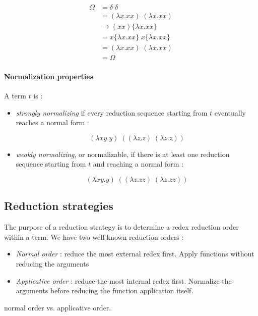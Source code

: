   \begin{align*}
    \Omega &= \delta\;\delta \\
          &= (\lambda x.xx)\; (\lambda x.xx) \\
          &\to (xx)\{\lambda x.xx\} \\
          &= x\{\lambda x.xx\}\;x\{\lambda x.xx\} \\
          &= (\lambda x.xx)\; (\lambda x.xx) \\
          &= \Omega
  \end{align*}

  \paragraph{Normalization properties} A term $t$ is :

  \begin{itemize}
    \item \textit{strongly normalizing} if every reduction sequence starting
      from $t$ eventually reaches a normal form :

      \[(\lambda xy.y)\;((\lambda z.z)\;(\lambda z.z))\]

    \item \textit{weakly normalizing}, or normalizable, if there is at least one
      reduction sequence starting from $t$ and reaching a normal form :

      \[(\lambda xy.y)\;((\lambda z.zz)\;(\lambda z.zz))\]
  \end{itemize}

  \subsection{Reduction strategies}

  The purpose of a reduction strategy is to determine a redex reduction order
  within a term. We have two well-known reduction orders :

  \begin{itemize}
    \item \textit{Normal order} : reduce the most external redex first. Apply
      functions without reducing the arguments
    \item \textit{Applicative order} : reduce the most internal redex first.
      Normalize the arguments before reducing the function application itself.
  \end{itemize}

  \exo normal order vs. applicative order.

